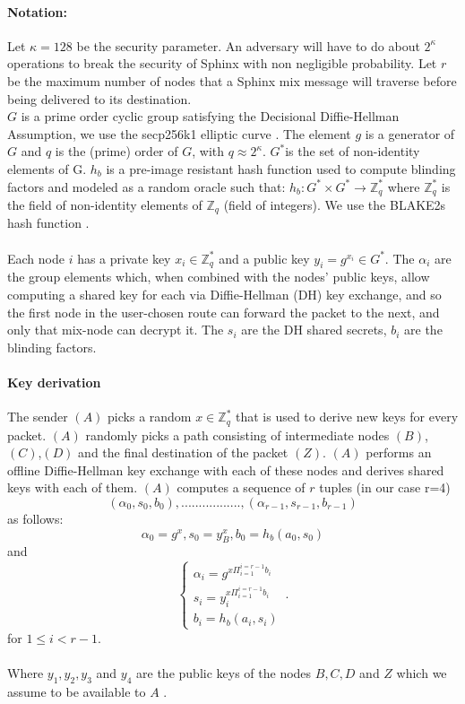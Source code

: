 \paragraph{Notation:}Let $\kappa=128$ be the security parameter. An adversary will have to do about $2^\kappa$ operations to break the security of Sphinx with non negligible probability.
Let $r$ be the maximum number of nodes that a Sphinx mix message will traverse before being delivered to its destination.
\\$G$ is a prime order cyclic group satisfying the Decisional Diffie-Hellman Assumption, we use the secp256k1 elliptic curve \cite{sec2}. The element $g$ is a generator of $G$ and $q$ is the (prime) order of $G$, with $q\approx2^{\kappa}$.
$G^*$is the set of non-identity elements of G. $h_b$ is a pre-image resistant hash function used to compute blinding factors and modeled as a random oracle such that:
$h_b:G^*\times G^*\rightarrow\mathbb{Z}^*_q$ where $\mathbb{Z}^*_q$ is the field of non-identity elements of $\mathbb{Z}_q$ (field of integers). We use the BLAKE2s hash function \cite{blake2}.
    \\~\\Each node $i$ has a private key $x_{i}\in \mathbb{Z}^*_q$ and a public key $y_{i}=g^{x_{i}}\in G^*$.
    The $\alpha_i$ are the group elements which, when combined with the nodes’ public keys, allow computing a shared key for each via Diffie-Hellman (DH) key exchange, and so the first node in the user-chosen route can forward the packet to the next, and only that mix-node can decrypt it.
    The $s_i$ are the DH shared secrets, $b_i$ are the blinding factors.

    \paragraph{Key derivation}
    The sender $(A)$ picks a random $x\in \mathbb{Z}^*_q$ that is used to derive new keys for every packet.
    \newline $(A)$ randomly picks a path consisting of intermediate nodes $(B)$, $(C)$,$(D)$ and the final destination of the packet $(Z)$.
    \newline $(A)$ performs an offline Diffie-Hellman key exchange with each of these nodes and derives shared keys with each of them.
    \newline $(A)$ computes a sequence of $r$ tuples (in our case r=4)  $$(\alpha_0,s_0,b_0),.................,(\alpha_{r-1},s_{r-1},b_{r-1})$$ as follows:
    $$\alpha_0=g^x,s_0=y^x_B,b_0=h_b(a_0,s_0)$$
    and
\begin{equation}
    \begin{cases}
        \alpha_i=g^{x\Pi_{i=1}^{i=r-1}b_i}\\
        s_i=y^{x\Pi_{i=1}^{i=r-1}b_i}_i \\
        b_i=h_b(a_i,s_i)
    \end{cases}\,.
    \label{eq:1}
\end{equation}
for $1\le i < r-1$. 
\\~\\Where $y_1, y_2,y_3$ and $y_4$ are the public keys of the nodes $B,C, D$ and $Z$  which we assume to be available to $A$ .

